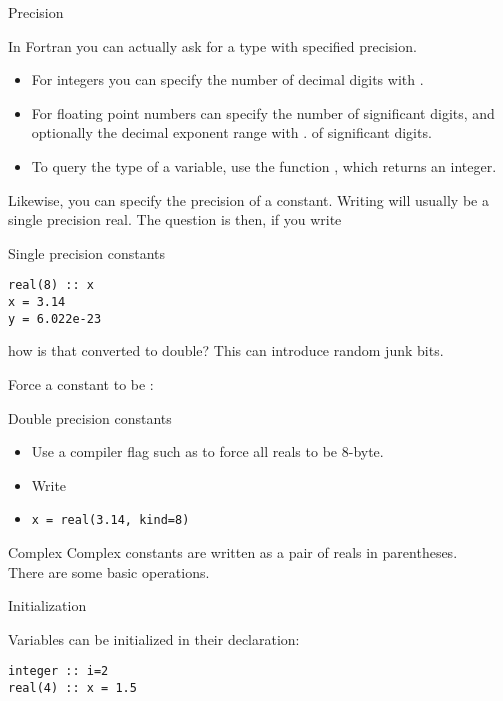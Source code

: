  {Precision}

In Fortran you can actually ask for a type with specified precision.
\begin{itemize}
\item For integers you can specify the number of decimal digits with
  .
\item For floating point numbers can specify the number of
  significant digits, and optionally the decimal exponent range with
  .
  of significant digits.
\item To query the type of a variable, use the function
  , which returns an integer.
\end{itemize}

Likewise, you can specify the precision of a constant.
Writing  will usually be a single precision
real. The question is then, if you write
\begin{block}{Single precision constants}
  \label{sl:fsingle}
\begin{verbatim}
real(8) :: x
x = 3.14
y = 6.022e-23
\end{verbatim}
\end{block}

how is that converted to double? This can introduce random junk bits.

Force a constant to be :
\begin{block}{Double precision constants}
  \label{sl:fdouble}
  \begin{itemize}
  \item Use a compiler flag such as  to force all reals to be 8-byte.
  \item Write 
  \item \verb+x = real(3.14, kind=8)+
  \end{itemize}
\end{block}

\begin{block}{Complex}
  \label{sl:fcomplex}
  Complex constants are written as a pair of reals in parentheses.\\
  There are some basic operations.
\end{block}

 {Initialization}

Variables can be initialized in their declaration:
\begin{verbatim}
integer :: i=2
real(4) :: x = 1.5
\end{verbatim}

